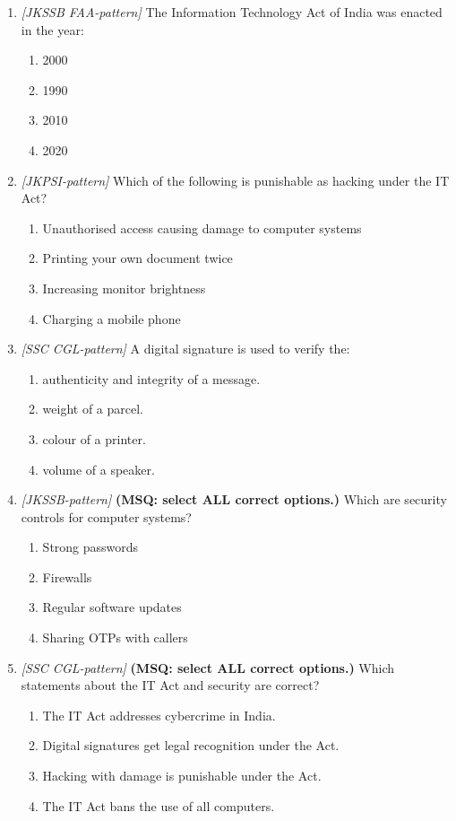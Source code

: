 \documentclass[11pt]{article}
\begin{document}
\begin{enumerate}[label=\textbf{Q\arabic*.}, leftmargin=*]
\item \textit{[JKSSB FAA-pattern]} The Information Technology Act of India was enacted in the year:
  \begin{enumerate}[label=\Alph*.]
    \item 2000
    \item 1990
    \item 2010
    \item 2020
  \end{enumerate}
\item \textit{[JKPSI-pattern]} Which of the following is punishable as hacking under the IT Act?
  \begin{enumerate}[label=\Alph*.]
    \item Unauthorised access causing damage to computer systems
    \item Printing your own document twice
    \item Increasing monitor brightness
    \item Charging a mobile phone
  \end{enumerate}
\item \textit{[SSC CGL-pattern]} A digital signature is used to verify the:
  \begin{enumerate}[label=\Alph*.]
    \item authenticity and integrity of a message.
    \item weight of a parcel.
    \item colour of a printer.
    \item volume of a speaker.
  \end{enumerate}
\item \textit{[JKSSB-pattern]} \textbf{(MSQ: select ALL correct options.)} Which are security controls for computer systems?
  \begin{enumerate}[label=\Alph*.]
    \item Strong passwords
    \item Firewalls
    \item Regular software updates
    \item Sharing OTPs with callers
  \end{enumerate}
\item \textit{[SSC CGL-pattern]} \textbf{(MSQ: select ALL correct options.)} Which statements about the IT Act and security are correct?
  \begin{enumerate}[label=\Alph*.]
    \item The IT Act addresses cybercrime in India.
    \item Digital signatures get legal recognition under the Act.
    \item Hacking with damage is punishable under the Act.
    \item The IT Act bans the use of all computers.
  \end{enumerate}
\end{enumerate}
\def\JKSSBLessonID{56}\def\JKSSBAnswers{0}
\end{document}
